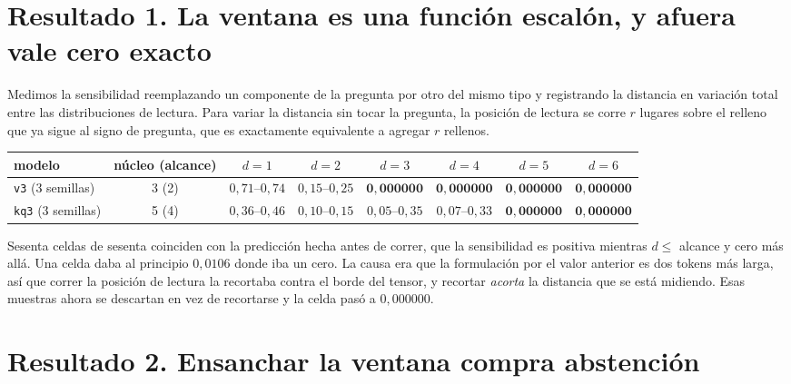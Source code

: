 \documentclass[11pt,a4paper]{article}
\begin{document}
\section{Resultado 1. La ventana es una función escalón, y afuera vale cero exacto}

Medimos la sensibilidad reemplazando un componente de la pregunta por otro del mismo tipo y
registrando la distancia en variación total entre las distribuciones de lectura. Para variar la
distancia sin tocar la pregunta, la posición de lectura se corre $r$ lugares sobre el relleno que ya
sigue al signo de pregunta, que es exactamente equivalente a agregar $r$ rellenos.

\begin{center}
\begin{tabular}{lccccccc}
\toprule
modelo & núcleo (alcance) & $d{=}1$ & $d{=}2$ & $d{=}3$ & $d{=}4$ & $d{=}5$ & $d{=}6$ \\
\midrule
\texttt{v3} (3 semillas) & 3 (2) & $0{,}71$--$0{,}74$ & $0{,}15$--$0{,}25$ & $\mathbf{0{,}000000}$ & $\mathbf{0{,}000000}$ & $\mathbf{0{,}000000}$ & $\mathbf{0{,}000000}$ \\
\texttt{kq3} (3 semillas) & 5 (4) & $0{,}36$--$0{,}46$ & $0{,}10$--$0{,}15$ & $0{,}05$--$0{,}35$ & $0{,}07$--$0{,}33$ & $\mathbf{0{,}000000}$ & $\mathbf{0{,}000000}$ \\
\bottomrule
\end{tabular}
\end{center}

Sesenta celdas de sesenta coinciden con la predicción hecha antes de correr, que la sensibilidad es
positiva mientras $d \le$ alcance y cero más allá. Una celda daba al principio $0{,}0106$ donde iba un
cero. La causa era que la formulación por el valor anterior es dos tokens más larga, así que correr la
posición de lectura la recortaba contra el borde del tensor, y recortar \emph{acorta} la distancia que
se está midiendo. Esas muestras ahora se descartan en vez de recortarse y la celda pasó a
$0{,}000000$.

\section{Resultado 2. Ensanchar la ventana compra abstención}
\end{document}
